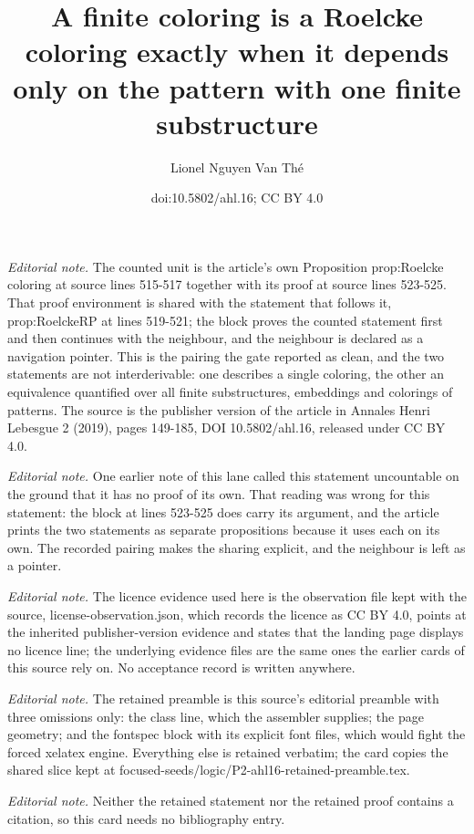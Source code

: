 \documentclass[10pt,a4paper]{article}
\title{A finite coloring is a Roelcke coloring exactly when it depends only on the pattern with one finite substructure}
\author{Lionel Nguyen Van Thé}
\date{doi:10.5802/ahl.16; CC BY 4.0}
\theoremstyle{definition}
\numberwithin{equation}{section}
\numberwithin{figure}{section}
\numberwithin{table}{section}
\begin{document}
\maketitle
\noindent\textit{Editorial note.} The counted unit is the article's own Proposition prop:Roelcke coloring at source lines 515-517 together with its proof at source lines 523-525. That proof environment is shared with the statement that follows it, prop:RoelckeRP at lines 519-521; the block proves the counted statement first and then continues with the neighbour, and the neighbour is declared as a navigation pointer. This is the pairing the gate reported as clean, and the two statements are not interderivable: one describes a single coloring, the other an equivalence quantified over all finite substructures, embeddings and colorings of patterns. The source is the publisher version of the article in Annales Henri Lebesgue 2 (2019), pages 149-185, DOI 10.5802/ahl.16, released under CC BY 4.0.\par\medskip
\noindent\textit{Editorial note.} One earlier note of this lane called this statement uncountable on the ground that it has no proof of its own. That reading was wrong for this statement: the block at lines 523-525 does carry its argument, and the article prints the two statements as separate propositions because it uses each on its own. The recorded pairing makes the sharing explicit, and the neighbour is left as a pointer.\par\medskip
\noindent\textit{Editorial note.} The licence evidence used here is the observation file kept with the source, license-observation.json, which records the licence as CC BY 4.0, points at the inherited publisher-version evidence and states that the landing page displays no licence line; the underlying evidence files are the same ones the earlier cards of this source rely on. No acceptance record is written anywhere.\par\medskip
\noindent\textit{Editorial note.} The retained preamble is this source's editorial preamble with three omissions only: the class line, which the assembler supplies; the page geometry; and the fontspec block with its explicit font files, which would fight the forced xelatex engine. Everything else is retained verbatim; the card copies the shared slice kept at focused-seeds/logic/P2-ahl16-retained-preamble.tex.\par\medskip
\noindent\textit{Editorial note.} Neither the retained statement nor the retained proof contains a citation, so this card needs no bibliography entry.\par\medskip
\end{document}
